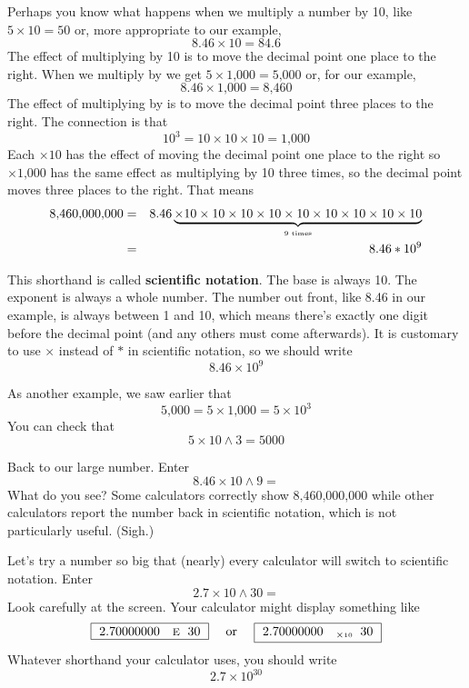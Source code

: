  Perhaps you know what happens when we multiply a number by 10, like
$ 5 \times 10 = 50$ or, more appropriate to our example, $$ 8.46 \times 10 = 84.6$$
The effect of multiplying by 10 is to move the decimal point one place to the right.
When we multiply by  we get
$ 5 \times \text{1,000} = \text{5,000} $ or, for our example, $$8.46 \times \text{1,000} = \text{8,460}$$
The effect of multiplying by  is to move the decimal point three places to the right.
The connection is that $$10^3=10 \times 10 \times 10  =\text{1,000}$$
Each $\times 10$ has the effect of moving the decimal point one place to the right so $\times \text{1,000}$ has the same effect as multiplying by 10 three times, so the decimal point moves three places to the right.
That means 
\begin{eqnarray*}
\text{8,460,000,000} & = & 8.46 \underbrace{\hbox{$\times 10 \times 10  \times 10  \times 10  \times 10  \times 10  \times 10  \times 10  \times 10 $}}_{\hbox{\begin{tiny} 9 times \end{tiny}}}  \\  %
& = & 8.46 \ast 10^ 9 \\  
\end{eqnarray*} 
\vspace{-.5in} %

This shorthand is called \textbf{scientific notation}.  The base is always 10.  The exponent is always a whole number.  The number out front, like 8.46 in our example, is always between 1 and 10, which means there's exactly one digit before the decimal point (and any others must come afterwards).  It is customary to use $\times$ instead of $\ast$ in scientific notation, so we should write
$$8.46\times10^9$$

As another example, we saw earlier that $$\text{5,000} = 5 \times \text{1,000} = 5 \times 10^3$$
You can check that  $$5 \times 10 \wedge 3 = 5000$$
 
Back to our large number.  Enter $$8.46 \times 10 \wedge 9=$$
What do you see?  Some calculators correctly show $\text{8,460,000,000}$ while other calculators report the number back in scientific notation, which is not particularly useful. (Sigh.)  

Let's try a number so big that (nearly) every calculator will switch to scientific notation.  Enter $$2.7\times 10 \wedge 30=$$
Look carefully at the screen.  Your calculator might display something like 
$$\boxed{~2.70000000 \quad \text{\begin{footnotesize}E \end{footnotesize}}~30~} \text{ \quad or \quad } \boxed{~2.70000000 \quad _{ \times \text{\begin{tiny}10 \end{tiny}}}~30~}$$ 
Whatever shorthand your calculator uses, you should write $$2.7 \times 10^{30}$$

